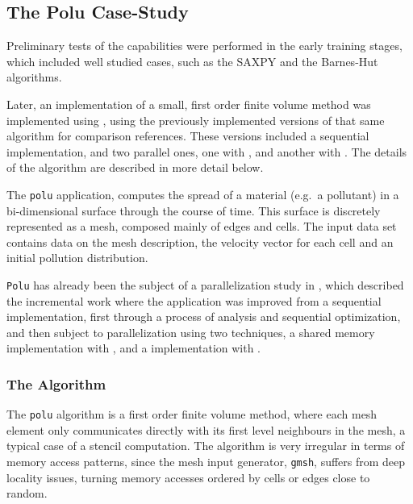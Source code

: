 \documentclass[main.tex]{subfiles}
\begin{document}
\subsection{The Polu Case-Study}

Preliminary tests of the \gama capabilities were performed in the early training stages, which included well studied cases, such as the SAXPY and the Barnes-Hut algorithms.

Later, an implementation of a small, first order finite volume method was implemented using \gama, using the previously implemented versions of that same algorithm for comparison references. These versions included a sequential implementation, and two parallel ones, one with \openmp, and another with \cuda. The details of the algorithm are described in more detail below.

The \texttt{polu} application, computes the spread of a material (e.g.\ a pollutant) in a bi-dimensional surface through the course of time. This surface is discretely represented as a mesh, composed mainly of edges and cells. The input data set contains data on the mesh description, the velocity vector for each cell and an initial pollution distribution.

\texttt{Polu} has already been the subject of a parallelization study in \cite{naps2012}, which described the incremental work where the application was improved from a sequential implementation, first through a process of analysis and sequential optimization, and then subject to parallelization using two techniques, a shared memory \cpu implementation with \openmp, and a \gpu implementation with \cuda.

\subsubsection{The Algorithm} \label{sec:polu:alg}

The \texttt{polu} algorithm is a first order finite volume method, where each mesh element only communicates directly with its first level neighbours in the mesh, a typical case of a stencil computation. The algorithm is very irregular in terms of memory access patterns, since the mesh input generator, \texttt{gmsh}, suffers from deep locality issues, turning memory accesses ordered by cells or edges close to random.
\end{document}
